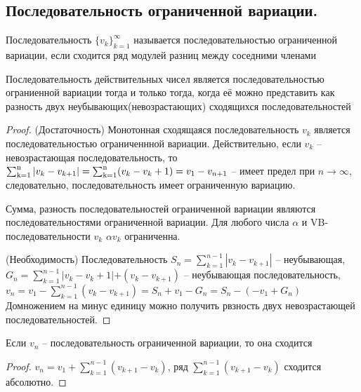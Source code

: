 \subsection*{Последовательность ограниченной вариации.}
\begin{deff}
Последовательность $\{v_k\}_{k=1}^{\infty}$ называется последовательностью ограниченной вариации, если сходится ряд модулей разниц между соседними членами
\end{deff}
\begin{thm}
Последовательность действительных чисел  является последовательностью ограниенной вариации тогда и только тогда, когда её можно представить как разность двух неубывающих(невозрастающих) сходящихся последовательностей
\end{thm}
\begin{proof}
(Достаточность)
Монотонная сходящаяся последовательность $v_k$ является последовательностью ограниченнной вариации.
Действительно, если $v_k$ -- невозрастающая последовательность, то $\operatorname{\sum_{k=1}^{n}} |v_k-v_{k+1}| = \operatorname{\sum_{k=1}^{n}}(v_k-v_k+1)= v_1-v_{n+1}$
-- имеет предел при $n \to  \infty$, следовательно, последовательность имеет ограниченную вариацию.

Сумма, разность последовательностей ограниченной вариации являются последовательностями ограниченной вариации. Для любого числа $\alpha$ и VB-последовательности $v_k$ \; $\alpha v_k$ ограниченна.

(Необходимость) Последовательность $S_n = \sum_{k=1}^{n-1} |v_k-v_{k+1}|$ -- неубывающая, $G_n = \sum_{k=1}^{n-1} \big |v_k -v_k+1|+(v_k-v_{k+1})$ -- неубывающая последовательность, $v_n = v_1 - \sum _{k=1}^{n-1}(v_k - v_{k+1})= S_n + v_1 - G_n=S_n -(-v_1 + G_n)$
Домножением на минус единицу можно получить рвзность двух невозрастающей последовательностей.
\end{proof}
\begin{thm}
Если $v_n$ -- последовательность ограниченной вариации, то она сходится
\end{thm}
\begin{proof}
$ v_n = v_1 + \sum_{k=1}^{n-1}(v_{k+1} - v_k)$, ряд $\sum_{k=1}^{n-1}( v_{k+1} - v_k) $ сходится абсолютно.
\end{proof}